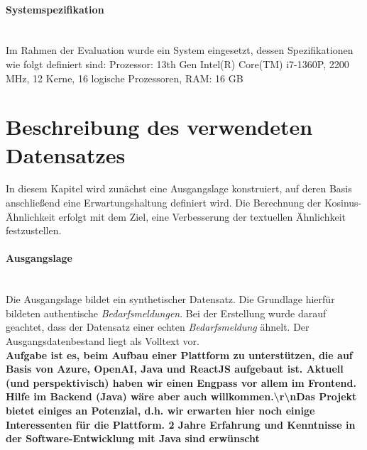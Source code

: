 \paragraph{Systemspezifikation}\mbox{}\\
Im Rahmen der Evaluation wurde ein System eingesetzt, dessen Spezifikationen wie folgt definiert sind: Prozessor: 13th Gen Intel(R) Core(TM) i7-1360P, 2200 MHz, 12 Kerne, 16 logische Prozessoren, RAM: 16 GB
\section{Beschreibung des verwendeten Datensatzes}
In diesem Kapitel wird zunächst eine Ausgangslage konstruiert, auf deren Basis anschließend eine Erwartungshaltung definiert wird. Die Berechnung der Kosinus-Ähnlichkeit erfolgt mit dem Ziel, eine Verbesserung der textuellen Ähnlichkeit festzustellen.
\paragraph{Ausgangslage}\mbox{}\\
Die Ausgangslage bildet ein synthetischer Datensatz. Die Grundlage hierfür bildeten authentische \emph{Bedarfsmeldungen}. Bei der Erstellung wurde darauf geachtet, dass der Datensatz einer echten \emph{Bedarfsmeldung} ähnelt. Der Ausgangsdatenbestand liegt als Volltext vor.\\

\textbf{Aufgabe ist es, beim Aufbau einer Plattform zu unterstützen, die auf Basis von Azure, OpenAI, Java und ReactJS aufgebaut ist. Aktuell (und perspektivisch) haben wir einen Engpass vor allem im Frontend. Hilfe im Backend (Java) wäre aber auch willkommen.\textbackslash r\textbackslash nDas Projekt bietet einiges an Potenzial, d.h. wir erwarten hier noch einige Interessenten für die Plattform. 2 Jahre Erfahrung und Kenntnisse in der Software-Entwicklung mit Java sind erwünscht}\\

